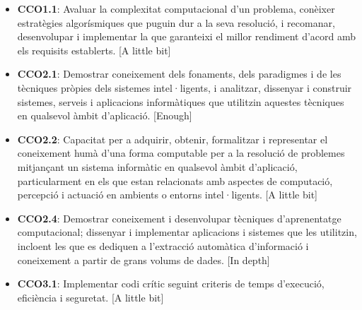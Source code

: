 \documentclass[a4paper]{article}
\begin{document}
    \begin{itemize}
        \item \textbf{CCO1.1}: Avaluar la complexitat computacional d'un problema, conèixer estratègies algorísmiques que puguin dur a la seva resolució, i recomanar, desenvolupar i implementar la que garanteixi el millor rendiment d'acord amb els requisits establerts. [A little bit]
        \item \textbf{CCO2.1}: Demostrar coneixement dels fonaments, dels paradigmes i de les tècniques pròpies dels sistemes intel·ligents, i analitzar, dissenyar i construir sistemes, serveis i aplicacions informàtiques que utilitzin aquestes tècniques en qualsevol àmbit d'aplicació. [Enough]
        \item \textbf{CCO2.2}: Capacitat per a adquirir, obtenir, formalitzar i representar el coneixement humà d'una forma computable per a la resolució de problemes mitjançant un sistema informàtic en qualsevol àmbit d'aplicació, particularment en els que estan relacionats amb aspectes de computació, percepció i actuació en ambients o entorns intel·ligents. [A little bit]
        \item \textbf{CCO2.4}: Demostrar coneixement i desenvolupar tècniques d'aprenentatge computacional; dissenyar i implementar aplicacions i sistemes que les utilitzin, incloent les que es dediquen a l'extracció automàtica d'informació i coneixement a partir de grans volums de dades. [In depth]
        \item \textbf{CCO3.1}: Implementar codi crític seguint criteris de temps d'execució, eficiència i seguretat. [A little bit]

    \end{itemize}






\printbibliography
\end{document}
